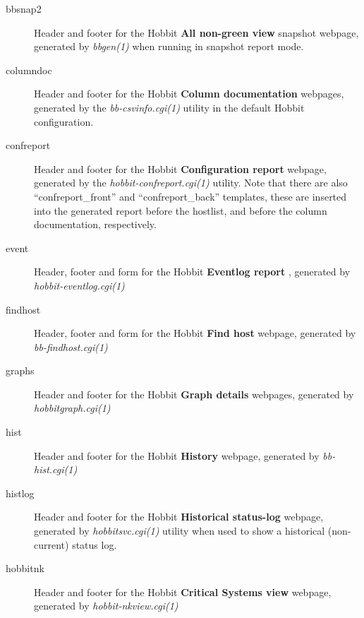 \begin{description}
 

\item[bbsnap2] Header and footer for the Hobbit \textbf{All non-green view}
 snapshot webpage, generated by \emph{bbgen(1)}
 when running in snapshot report mode. 

 

\item[columndoc] Header and footer for the Hobbit \textbf{Column documentation}
 webpages, generated by the \emph{bb-csvinfo.cgi(1)}
 utility in the default Hobbit configuration. 

 

\item[confreport] Header and footer for the Hobbit \textbf{Configuration report}
 webpage, generated by the \emph{hobbit-confreport.cgi(1)}
 utility. Note that there are also ``confreport\_front'' and ``confreport\_back'' templates, these are inserted into the generated report before the hostlist, and before the column documentation, respectively. 

 

\item[event] Header, footer and form for the Hobbit \textbf{Eventlog report}
, generated by \emph{hobbit-eventlog.cgi(1)}


 

\item[findhost] Header, footer and form for the Hobbit \textbf{Find host}
 webpage, generated by \emph{bb-findhost.cgi(1)}


 

\item[graphs] Header and footer for the Hobbit \textbf{Graph details}
 webpages, generated by \emph{hobbitgraph.cgi(1)}


 

\item[hist] Header and footer for the Hobbit \textbf{History}
 webpage, generated by \emph{bb-hist.cgi(1)}


 

\item[histlog] Header and footer for the Hobbit \textbf{Historical status-log}
 webpage, generated by \emph{hobbitsvc.cgi(1)}
 utility when used to show a historical (non-current) status log. 

 

\item[hobbitnk] Header and footer for the Hobbit \textbf{Critical Systems view}
 webpage, generated by \emph{hobbit-nkview.cgi(1)}



\end{description}
